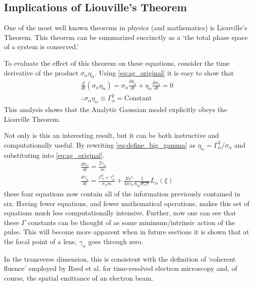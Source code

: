 
\subsection{Implications of Liouville's Theorem}

One of the most well known theorems in physics (and mathematics) is Liouville's Theorem.
This theorem can be summarized succinctly as a `the total phase space of a system is conserved.'

To evaluate the effect of this theorem on these equations, consider the time derivative of the product $\sigma_{\alpha} \eta_{\alpha}$.
Using \ref{eq:ag_original} it is easy to show that
\begin{gather}
  \frac{d}{dt} (\sigma_{\alpha} \eta_{\alpha}) = \sigma_{\alpha} \frac{d \eta_{\alpha}}{dt} + \eta_{\alpha} \frac{d \sigma_{\alpha}}{dt} = 0\\
  \label{eq:define_big_gamma}
  \therefore \sigma_{\alpha} \eta_{\alpha} \equiv \Gamma_{\alpha}^2 = \text{Constant}
\end{gather}
This analysis shows that the Analytic Gaussian model explicitly obeys the Liouville Theorem.

Not only is this an interesting result, but it can be both instructive and computationally useful.
By rewriting \ref{eq:define_big_gamma} as $\eta_{\alpha} = \Gamma_{\alpha}^2 / \sigma_{\alpha}$ and substituting into \ref{eq:ag_original}.
\begin{subequations} \label{eq:ag_big_gamma}
\begin{gather}
  \frac{d\sigma_{\alpha}}{dt} = \frac{2\gamma_{\alpha}}{m} \\
  \frac{d\gamma_{\alpha}}{dt} = \frac{ \Gamma_{\alpha}^2 + \gamma_{\alpha}^2 }{\sigma_{\alpha} m}
    + \frac{N e^2}{4\pi\varepsilon_0} \frac{1}{6 \sqrt{\sigma_{\alpha}\pi}} L_{\alpha}(\xi)
\end{gather}
\end{subequations}
these four equations now contain all of the information previously contained in six. Having fewer equations, and fewer mathematical operations, makes this set of equations much less computationally intensive.
Further, now one can see that these $\Gamma$ constants can be thought of as some minimum/intrinsic action of the pulse. 
This will become more apparent when in future sections
it is shown that at the focal point of a lens, $\gamma_{\alpha}$ goes through zero.

In the transverse dimension, this is consistent with the definition of `coherent fluence' employed by Reed et al.\cite{reed_evolution_2009} for time-resolved electron microscopy and, of course, the spatial emittance of an electron beam\cite{jensen_theoretical_2006,siwick_ultrafast_2002}.
